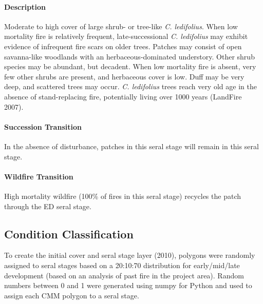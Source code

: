 \paragraph{Description} Moderate to high cover of large shrub- or tree-like \emph{C. ledifolius}. When low mortality fire is relatively frequent, late-successional \emph{C. ledifolius} may exhibit evidence of infrequent fire scars on older trees. Patches may consist of open savanna-like woodlands with an herbaceous-dominated understory. Other shrub species may be abundant, but decadent. When low mortality fire is absent, very few other shrubs are present, and herbaceous cover is low. Duff may be very deep, and scattered trees may occur. \emph{C. ledifolius} trees reach very old age in the absence of stand-replacing fire, potentially living over 1000 years (LandFire 2007).

\paragraph{Succession Transition} In the absence of disturbance, patches in this seral stage will remain in this seral stage. 

\paragraph{Wildfire Transition} High mortality wildfire (100\% of fires in this seral stage) recycles the patch through the ED seral stage.

\noindent\hrulefill

\subsection*{Condition Classification}
To create the initial cover and seral stage layer (2010), polygons were randomly assigned to seral stages based on a 20:10:70 distribution for early/mid/late development (based on an analysis of past fire in the project area). Random numbers between 0 and 1 were generated using numpy for Python and used to assign each CMM polygon to a seral stage.





